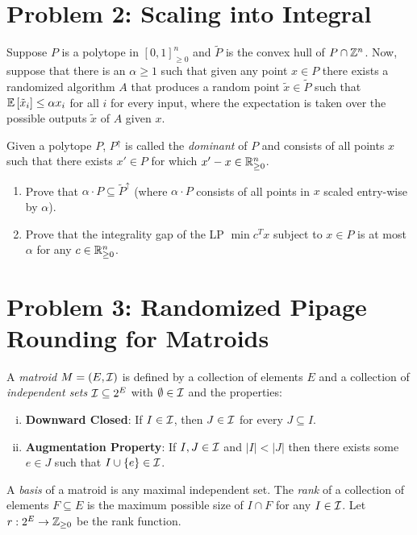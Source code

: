\section{Problem 2: Scaling into Integral}

Suppose $P$ is a polytope in $[0,1]_{\ge 0}^n$ and $\tilde{P}$ is the convex hull of $P \cap \mathbb Z^n$. Now, suppose that there is an $\alpha \ge 1$ such that given any point $x \in P$ there exists a randomized algorithm $A$ that produces a random point $\tilde{x} \in \tilde{P}$ such that ${\mathbb{E}}\left[\tilde{x}_i\right] \le \alpha x_i$ for all $i$ for every input, where the expectation is taken over the possible outputs $\tilde{x}$ of $A$ given $x$. 

Given a polytope $P$, $P^\uparrow$ is called the \textit{dominant} of $P$ and consists of all points $x$ such that there exists $x' \in P$ for which $x'-x \in \mathbb R^n_{\ge 0}$.
\begin{enumerate}
	\item Prove that $\alpha \cdot P \subseteq \tilde{P}^\uparrow$ (where $\alpha \cdot P$ consists of all points in $x$ scaled entry-wise by $\alpha$).
	\item Prove that the integrality gap of the LP $\min c^Tx$ subject to $x \in P$ is at most $\alpha$ for any $c \in \mathbb R^n_{\ge 0}$.
\end{enumerate}

\section{Problem 3: Randomized Pipage Rounding for Matroids}

A \textit{matroid} $M=(E,{\cal I})$ is defined by a collection of elements $E$ and a collection of \textit{independent sets} ${\cal I} \subseteq 2^E$ with $\emptyset \in {\cal I}$ and the properties:
\begin{enumerate}[(i)]
\item \textbf{Downward Closed}: If $I \in {\cal I}$, then $J \in {\cal I}$ for every $J \subseteq I$.
\item \textbf{Augmentation Property}: If $I,J \in {\cal I}$ and $|I| < |J|$ then there exists some $e \in J$ such that $I \cup \{e\} \in {\cal I}$. 
\end{enumerate}
A \textit{basis} of a matroid is any maximal independent set. The \textit{rank} of a collection of elements $F \subseteq E$ is the maximum possible size of $I \cap F$ for any $I \in {\cal I}$. Let $r: 2^E \to \mathbb Z_{\ge 0}$ be the rank function.

